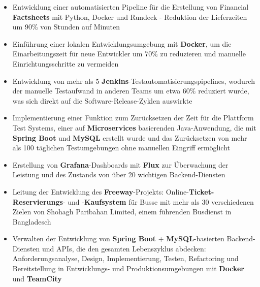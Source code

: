 \documentclass[10pt,a4paper,ragged2e,withhyper]{altacv}
\renewcommand{\divider}{\textcolor{PastelRed!50}{\hdashrule{1.015\linewidth}{0.6pt}{0.6ex}}\medskip}
\begin{document}
\begin{paracol}{2}
\vspace{0.75em}

\begin{itemize}
\item \justifying Entwicklung einer automatisierten Pipeline für die Erstellung von Financial \textbf{Factsheets} mit Python, Docker und Rundeck - Reduktion der Lieferzeiten um 90\% von Stunden auf Minuten
\item \justifying Einführung einer lokalen Entwicklungsumgebung mit \textbf{Docker}, um die Einarbeitungszeit für neue Entwickler um 70\% zu reduzieren und manuelle Einrichtungsschritte zu vermeiden
\item \justifying Entwicklung von mehr als 5 \textbf{Jenkins}-Testautomatisierungspipelines, wodurch der manuelle Testaufwand in anderen Teams um etwa 60\% reduziert wurde, was sich direkt auf die Software-Release-Zyklen auswirkte
\item \justifying Implementierung einer Funktion zum Zurücksetzen der Zeit für die Plattform Test Systems, einer auf \textbf{Microservices} basierenden Java-Anwendung, die mit \textbf{Spring Boot} und \textbf{MySQL} erstellt wurde und das Zurücksetzen von mehr als 100 täglichen Testumgebungen ohne manuellen Eingriff ermöglicht
\item \justifying Erstellung von \textbf{Grafana}-Dashboards mit \textbf{Flux} zur Überwachung der Leistung und des Zustands von über 20 wichtigen Backend-Diensten
\end{itemize}

\vspace{0.75em}

\divider

\vspace{0.75em}

\begin{itemize}
\item \justifying Leitung der Entwicklung des \textbf{Freeway}-Projekts: Online-\textbf{Ticket-Reservierungs}- und -\textbf{Kaufsystem} für Busse mit mehr als 30 verschiedenen Zielen von Shohagh Paribahan Limited, einem führenden Busdienst in Bangladesch
\item \justifying Verwalten der Entwicklung von \textbf{Spring Boot} + \textbf{MySQL}-basierten Backend-Diensten und APIs, die den gesamten Lebenszyklus abdecken: Anforderungsanalyse, Design, Implementierung, Testen, Refactoring und Bereitstellung in Entwicklungs- und Produktionsumgebungen mit \textbf{Docker} und \textbf{TeamCity}
\end{itemize}


\end{paracol}
\end{document}
